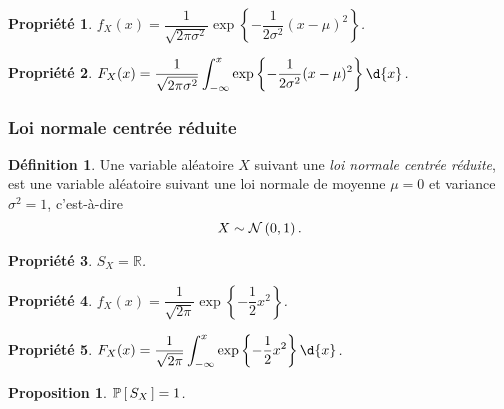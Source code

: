 \documentclass[11pt]{article}
\makeatletter
\renewcommand\P[1]{%
	\ensuremath{%
		\mathbb{P}\left[\,#1\,\right]%
	}%
}%
\newcommand\Norm[2]{%
	\ensuremath{%
		\mathcal{N}\left(#1,#2\right)%
	}%
}%
\newtheorem*{proposition}{Proposition}
\newtheorem{property}{Propriété}
\theoremstyle{remark}
\theoremstyle{definition}
\newtheorem*{@definition}{Définition}
\newenvironment{definition}{%
	\begin{@definition}%
}{%
	\end{@definition}%
	\setcounter{property}{0}%
}
\makeatother
\begin{document}
\begin{property}
	$f_X(x)=\dfrac{1}{\sqrt{2\pi\sigma^2}}\exp\left\{
		-\dfrac{1}{2\sigma^2}(x-\mu)^2
	\right\}$.
\end{property}

\begin{property}
	$F_X(x)=\dfrac{1}{\sqrt{2\pi\sigma^2}}\displaystyle\int_{-\infty}^x
		\exp\left\{-\dfrac{1}{2\sigma^2}(x-\mu)^2\right\}\d{x}$.
\end{property}


\subsubsection{Loi normale centrée réduite}
\begin{definition}
	Une variable aléatoire $X$ suivant une \textit{loi normale centrée
	réduite}, est une variable aléatoire suivant une loi normale de moyenne
	$\mu=0$ et variance $\sigma^2=1$, c'est-à-dire
	\begin{equation*}
		X\sim\Norm{0}{1}.
	\end{equation*}
\end{definition}

\begin{property}
	$S_X=\mathbb{R}$.
\end{property}

\begin{property}
	$f_X(x)=\dfrac{1}{\sqrt{2\pi}}\exp\left\{-\dfrac{1}{2}x^2\right\}$.
\end{property}

\begin{property}
	$F_X(x)=\dfrac{1}{\sqrt{2\pi}}\displaystyle\int_{-\infty}^x
		\exp\left\{-\frac{1}{2}x^2\right\}\d{x}$.
\end{property}

\begin{proposition}
	$\P{S_X}=1$.
\end{proposition}
\end{document}
